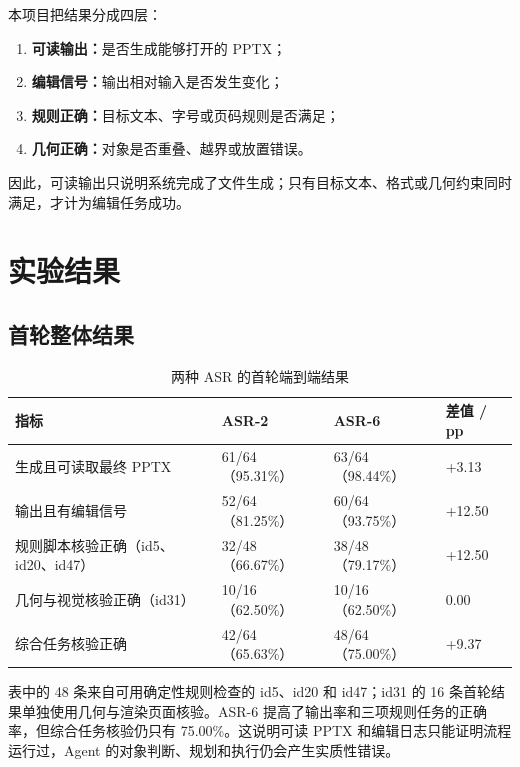 \documentclass[11pt,a4paper,UTF8,fontset=fandol]{ctexart}
\begin{document}
本项目把结果分成四层：

\begin{enumerate}
  \item \textbf{可读输出：}是否生成能够打开的 PPTX；
  \item \textbf{编辑信号：}输出相对输入是否发生变化；
  \item \textbf{规则正确：}目标文本、字号或页码规则是否满足；
  \item \textbf{几何正确：}对象是否重叠、越界或放置错误。
\end{enumerate}

因此，可读输出只说明系统完成了文件生成；只有目标文本、格式或几何约束同时满足，才计为编辑任务成功。

\section{实验结果}

\subsection{首轮整体结果}

\begin{table}[H]
\centering
\caption{两种 ASR 的首轮端到端结果}
\small
\begin{tabularx}{\textwidth}{Y C{3.1cm} C{3.1cm} C{2.2cm}}
\toprule
指标 & ASR-2 & ASR-6 & 差值 / pp \\
\midrule
生成且可读取最终 PPTX & 61/64（95.31\%） & 63/64（98.44\%） & +3.13 \\
输出且有编辑信号 & 52/64（81.25\%） & 60/64（93.75\%） & +12.50 \\
规则脚本核验正确（id5、id20、id47） & 32/48（66.67\%） & 38/48（79.17\%） & +12.50 \\
几何与视觉核验正确（id31） & 10/16（62.50\%） & 10/16（62.50\%） & 0.00 \\
综合任务核验正确 & 42/64（65.63\%） & 48/64（75.00\%） & +9.37 \\
\bottomrule
\end{tabularx}
\end{table}

表中的 48 条来自可用确定性规则检查的 id5、id20 和 id47；id31 的 16 条首轮结果单独使用几何与渲染页面核验。ASR-6 提高了输出率和三项规则任务的正确率，但综合任务核验仍只有 75.00\%。这说明可读 PPTX 和编辑日志只能证明流程运行过，Agent 的对象判断、规划和执行仍会产生实质性错误。
\end{document}
